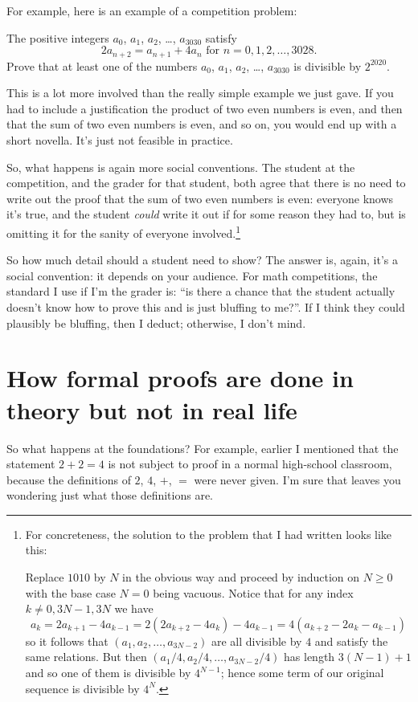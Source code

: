 \documentclass[11pt]{scrartcl}
\begin{document}
For example, here is an example of a competition problem:
\begin{problem}
The positive integers $a_0$, $a_1$, $a_2$, \dots, $a_{3030}$ satisfy
\[ 2a_{n + 2} = a_{n + 1} + 4a_n \text{ for } n = 0, 1, 2, \dots, 3028.  \]
Prove that at least one of the numbers
$a_0$, $a_1$, $a_2$, \dots, $a_{3030}$ is divisible by $2^{2020}$.
\end{problem}
This is a lot more involved than the really simple example we just gave.
If you had to include a justification the product of two even numbers is
even, and then that the sum of two even numbers is even, and so on,
you would end up with a short novella.
It's just not feasible in practice.

So, what happens is again more social conventions.
The student at the competition, and the grader for that student,
both agree that there is no need to write out the proof that
the sum of two even numbers is even: everyone knows it's true,
and the student \emph{could} write it out if for some reason they had to,
but is omitting it for the sanity of everyone involved.\footnote{For
concreteness, the solution to the problem that I had written looks like this:

Replace $1010$ by $N$ in the obvious way and proceed by induction on $N \ge 0$
with the base case $N = 0$ being vacuous.
Notice that for any index $k \neq 0, 3N-1, 3N$ we have
\[ a_k = 2a_{k+1} - 4a_{k-1} = 2(2a_{k+2}-4a_k)-4a_{k-1}
  = 4(a_{k+2}-2a_k-a_{k-1}) \]
so it follows that $(a_1, a_2, \dots, a_{3N-2})$
are all divisible by $4$ and satisfy the same relations.
But then $(a_1/4, a_2/4, \dots, a_{3N-2}/4)$ has length $3(N-1)+1$
and so one of them is divisible by $4^{N-1}$;
hence some term of our original sequence is divisible by $4^N$.}

So how much detail should a student need to show?
The answer is, again, it's a social convention: it depends on your audience.
For math competitions, the standard I use if I'm the grader is:
``is there a chance that the student actually doesn't know how to prove
this and is just bluffing to me?''.
If I think they could plausibly be bluffing, then I deduct;
otherwise, I don't mind.

\section{How formal proofs are done in theory but not in real life}
\label{sec:theory}

So what happens at the foundations?
For example, earlier I mentioned that the statement $2+2=4$
is not subject to proof in a normal high-school classroom,
because the definitions of $2$, $4$, $+$, $=$ were never given.
I'm sure that leaves you wondering just what those definitions are.
\end{document}

